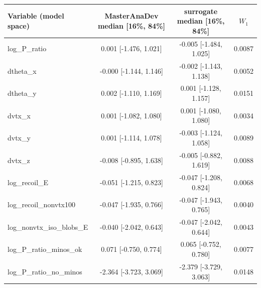\begin{tabular}{lccc}
\toprule
Variable (model space) & MasterAnaDev median [16\%, 84\%] & surrogate median [16\%, 84\%] & $W_1$ \\
\midrule
log\_P\_ratio & 0.001 [-1.476, 1.021] & -0.005 [-1.484, 1.025] & 0.0087 \\
dtheta\_x & -0.000 [-1.144, 1.146] & -0.002 [-1.143, 1.138] & 0.0052 \\
dtheta\_y & 0.002 [-1.110, 1.169] & 0.001 [-1.128, 1.157] & 0.0151 \\
dvtx\_x & 0.001 [-1.082, 1.080] & 0.001 [-1.080, 1.080] & 0.0034 \\
dvtx\_y & 0.001 [-1.114, 1.078] & -0.003 [-1.124, 1.058] & 0.0089 \\
dvtx\_z & -0.008 [-0.895, 1.638] & -0.005 [-0.882, 1.619] & 0.0088 \\
log\_recoil\_E & -0.051 [-1.215, 0.823] & -0.047 [-1.208, 0.824] & 0.0068 \\
log\_recoil\_nonvtx100 & -0.047 [-1.935, 0.766] & -0.047 [-1.943, 0.765] & 0.0040 \\
log\_nonvtx\_iso\_blobs\_E & -0.040 [-2.042, 0.643] & -0.047 [-2.042, 0.644] & 0.0043 \\
log\_P\_ratio\_minos\_ok & 0.071 [-0.750, 0.774] & 0.065 [-0.752, 0.780] & 0.0077 \\
log\_P\_ratio\_no\_minos & -2.364 [-3.723, 3.069] & -2.379 [-3.729, 3.063] & 0.0148 \\
\bottomrule
\end{tabular}
